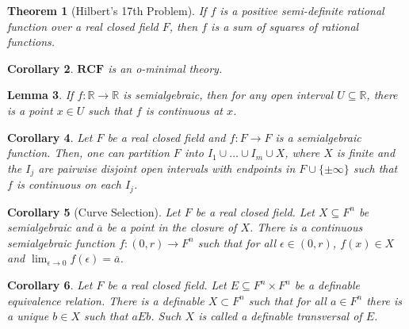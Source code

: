 \documentclass{amsart}
\newtheorem{theorem}{Theorem}[subsection]
\newtheorem{lemma}[theorem]{Lemma}
\newtheorem{corollary}[theorem]{Corollary}
\theoremstyle{definition}
\numberwithin{equation}{section}
\begin{document}
\begin{theorem}[Hilbert's 17th Problem]
    If $f$ is a positive semi-definite rational function over a real closed field $F$,
    then $f$ is a sum of squares of rational functions.
\end{theorem}

\begin{corollary}
    $\mathbf{RCF}$ is an o-minimal theory.
\end{corollary}

\begin{lemma}
    If $f:\mathbb{R} \to \mathbb{R}$ is semialgebraic,
    then for any open interval $U \subseteq \mathbb{R}$,
    there is a point $x\in U$ such that $f$ is continuous at $x$.
\end{lemma}

\begin{corollary}
    Let $F$ be a real closed field and $f: F \to F$ is a semialgebraic function.
    Then, one can partition $F$ into $I_1\cup \dots \cup I_m\cup X$,
    where $X$ is finite and the $I_j$ are pairwise disjoint open intervals with endpoints in $F\cup \{\pm\infty\}$
    such that $f$ is continuous on each $I_j$.
\end{corollary}

\begin{corollary}[Curve Selection]
    Let $F$ be a real closed field.
    Let $X \subseteq F^n$ be semialgebraic and $\overline{a}$
    be a point in the closure of $X$.
    There is a continuous semialgebraic function $f:(0,r) \to F^n$
    such that for all $\epsilon\in(0,r)$, $f(x) \in X$ and $\lim_{\epsilon\to 0} f(\epsilon) = \overline{a}$.
\end{corollary}

\begin{corollary}
    Let $F$ be a real closed field.
    Let $E \subseteq F^n \times F^n$ be a definable equivalence relation.
    There is a definable $X \subset F^n$ such that for all 
    $a \in F^n$ there is a unique $b\in X$ such that $aEb$.
    Such $X$ is called a definable \emph{transversal} of $E$.
\end{corollary}
\end{document}
